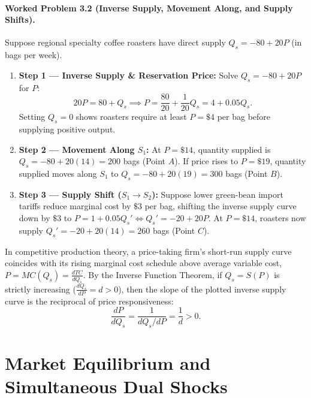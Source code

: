 \documentclass[11pt,letterpaper]{article}
\begin{document}
\paragraph{Worked Problem 3.2 (Inverse Supply, Movement Along, and Supply Shifts).}
Suppose regional specialty coffee roasters have direct supply $Q_s = -80 + 20P$ (in bags per week).
\begin{enumerate}
  \item \textbf{Step 1 — Inverse Supply \& Reservation Price:} Solve $Q_s = -80 + 20P$ for $P$:
  $$20P = 80 + Q_s \implies P = \frac{80}{20} + \frac{1}{20}Q_s = 4 + 0.05Q_s.$$
  Setting $Q_s = 0$ shows roasters require at least $P = \$4$ per bag before supplying positive output.
  \item \textbf{Step 2 — Movement Along $S_1$:} At $P = \$14$, quantity supplied is $Q_s = -80 + 20(14) = 200$ bags (Point $A$). If price rises to $P = \$19$, quantity supplied moves along $S_1$ to $Q_s = -80 + 20(19) = 300$ bags (Point $B$).
  \item \textbf{Step 3 — Supply Shift ($S_1 \to S_2$):} Suppose lower green-bean import tariffs reduce marginal cost by $\$3$ per bag, shifting the inverse supply curve down by $\$3$ to $P = 1 + 0.05Q_s' \iff Q_s' = -20 + 20P$. At $P = \$14$, roasters now supply $Q_s' = -20 + 20(14) = 260$ bags (Point $C$).
\end{enumerate}

\begin{coreprinciple}
In competitive production theory, a price-taking firm's short-run supply curve coincides with its rising marginal cost schedule above average variable cost, $P = MC(Q_s) = \frac{dTC}{dQ_s}$. By the Inverse Function Theorem, if $Q_s = S(P)$ is strictly increasing ($\frac{dQ_s}{dP} = d > 0$), then the slope of the plotted inverse supply curve is the reciprocal of price responsiveness:
$$\frac{dP}{dQ_s} = \frac{1}{dQ_s / dP} = \frac{1}{d} > 0.$$
\end{coreprinciple}

\section{Market Equilibrium and Simultaneous Dual Shocks}
\end{document}
